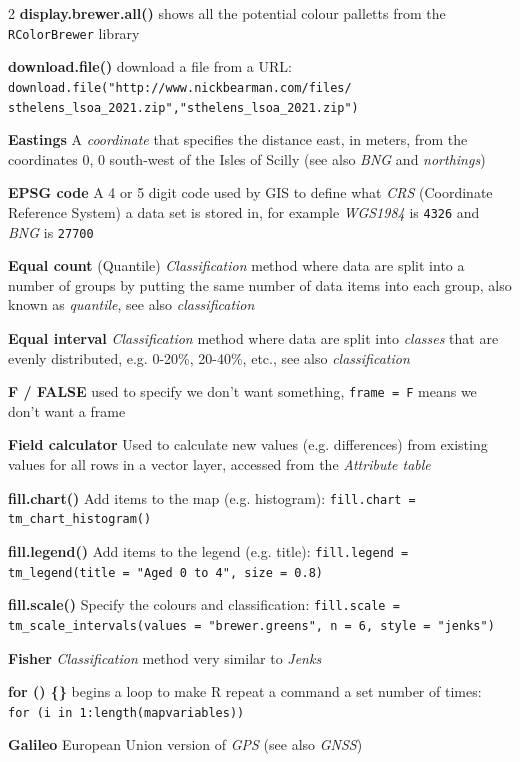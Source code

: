 \documentclass[a4paper,10pt]{article}
\begin{document}
\begin{multicols}{2}
\textbf{display.brewer.all()} shows all the potential colour palletts from the \texttt{RColorBrewer} library

\textbf{download.file()} download a file from a URL: \texttt{download.file("http://www.nickbearman.com/files/
sthelens\_lsoa\_2021.zip","sthelens\_lsoa\_2021.zip")}

\textbf{Eastings} A \textit{coordinate} that specifies the distance east, in meters, from the coordinates 0, 0 south-west of the Isles of Scilly (see also \textit{BNG} and \textit{northings})

\textbf{EPSG code} A 4 or 5 digit code used by GIS to define what \textit{CRS} (Coordinate Reference System) a data set is stored in, for example \textit{WGS1984} is \texttt{4326} and \textit{BNG} is \texttt{27700}

\textbf{Equal count} (Quantile) \textit{Classification} method where data are split into a number of groups by putting the same number of data items into each group, also known as \textit{quantile}, see also \textit{classification}

\textbf{Equal interval} \textit{Classification} method where data are split into \textit{classes} that are evenly distributed, e.g. 0-20\%, 20-40\%, etc., see also \textit{classification} 

\textbf{F / FALSE} used to specify we don't want something, \texttt{frame = F} means we don't want a frame

\textbf{Field calculator} Used to calculate new values (e.g. differences) from existing values for all rows in a vector layer, accessed from the \textit{Attribute table} 

\textbf{fill.chart()} Add items to the map (e.g. 
histogram): \texttt{fill.chart = tm\_chart\_histogram()}

\textbf{fill.legend()} Add items to the legend (e.g. title): \texttt{fill.legend = tm\_legend(title = "Aged 0 to 4", size = 0.8)}

\textbf{fill.scale()} Specify the colours and classification: \texttt{fill.scale = tm\_scale\_intervals(values = "brewer.greens", n = 6, style = "jenks")}

\textbf{Fisher} \textit{Classification} method very similar to \textit{Jenks} 

\textbf{for () \{\}} begins a loop to make R repeat a command a set number of times:\\
\texttt{for (i in 1:length(mapvariables))}

\textbf{Galileo} European Union version of \textit{GPS} (see also \textit{GNSS})


\end{multicols}
\end{document}
